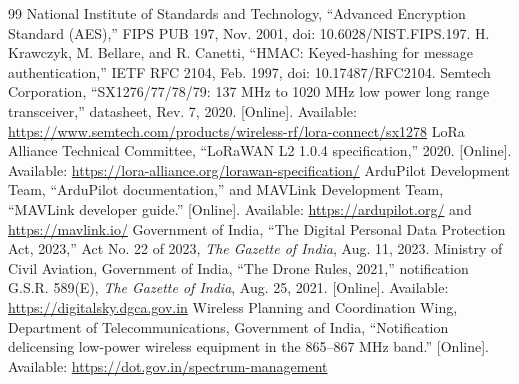 \documentclass[conference]{IEEEtran}
\begin{document}
\begin{thebibliography}{99}
 National Institute of Standards and Technology, ``Advanced Encryption Standard (AES),'' FIPS PUB 197, Nov. 2001, doi: 10.6028/NIST.FIPS.197.
 H. Krawczyk, M. Bellare, and R. Canetti, ``HMAC: Keyed-hashing for message authentication,'' IETF RFC 2104, Feb. 1997, doi: 10.17487/RFC2104.
 Semtech Corporation, ``SX1276/77/78/79: 137 MHz to 1020 MHz low power long range transceiver,'' datasheet, Rev. 7, 2020. [Online]. Available: \url{https://www.semtech.com/products/wireless-rf/lora-connect/sx1278}
 LoRa Alliance Technical Committee, ``LoRaWAN L2 1.0.4 specification,'' 2020. [Online]. Available: \url{https://lora-alliance.org/lorawan-specification/}
 ArduPilot Development Team, ``ArduPilot documentation,'' and MAVLink Development Team, ``MAVLink developer guide.'' [Online]. Available: \url{https://ardupilot.org/} and \url{https://mavlink.io/}
 Government of India, ``The Digital Personal Data Protection Act, 2023,'' Act No. 22 of 2023, \emph{The Gazette of India}, Aug. 11, 2023.
 Ministry of Civil Aviation, Government of India, ``The Drone Rules, 2021,'' notification G.S.R. 589(E), \emph{The Gazette of India}, Aug. 25, 2021. [Online]. Available: \url{https://digitalsky.dgca.gov.in}
 Wireless Planning and Coordination Wing, Department of Telecommunications, Government of India, ``Notification delicensing low-power wireless equipment in the 865--867 MHz band.'' [Online]. Available: \url{https://dot.gov.in/spectrum-management}
\end{thebibliography}
\end{document}
